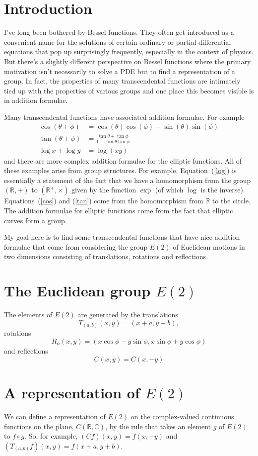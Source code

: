 \documentclass{article}
\begin{document}
\section{Introduction}
I've long been bothered by Bessel functions.
They often get introduced as a convenient name for the solutions of certain ordinary or partial differential equations that pop up surprisingly frequently, especially in the context of physics.
But there's a slightly different perspective on Bessel functions where the primary motivation isn't necessarily to solve a PDE but to find a representation of a group.
In fact, the properties of many transcendental functions are intimately tied up with the properties of various groups and one place this becomes visible is in addition formulae.

Many transcendental functions have associated addition formulae.
For example
\begin{align}
\cos(\theta+\phi) & = \cos(\theta)\cos(\phi)-\sin(\theta)\sin(\phi) \label{cos} \\
\tan(\theta+\phi) &= \frac{\tan\theta+\tan\phi}{1-\tan\theta\tan\phi} \label{tan} \\
\log x+\log y &= \log(xy) \label{log}
\end{align}
and there are more complex addition formulae for the elliptic functions.
All of these examples arise from group structures.
For example, Equation~(\ref{log}) is essentially a statement of the fact that we have a homomorphism from the group $(\mathbb{R},+)$ to $(\mathbb{R}^+,\times)$ given by the function $\exp$ (of which $\log$ is the inverse).
Equations~(\ref{cos}) and (\ref{tan}) come from the homomorphism from $\mathbb{R}$ to the circle.
The addition formulae for elliptic functions come from the fact that elliptic curves form a group.

My goal here is to find some transcendental functions that have nice addition formulae that come from considering the group $E(2)$ of Euclidean motions in two dimensions consisting of translations, rotations and reflections.

\section{The Euclidean group $E(2)$}
The elements of $E(2)$ are generated by the translations
\[
T_{(a,b)}(x,y) = (x+a,y+b),
\]
rotations
\[
R_{\phi}(x,y) = (x\cos\phi-y\sin\phi,x\sin\phi+y\cos\phi)
\]
and reflections
\[
C(x,y) = C(x,-y)
\]

\section{A representation of $E(2)$}
We can define a representation of $E(2)$ on the complex-valued continuous functions on the plane, $C(\mathbb{R},\mathbb{C})$,
by the rule that takes an element $g$ of $E(2)$ to $f \circ g$.
So, for example, $(Cf)(x,y) = f(x,-y)$ and $(T_{(a,b)}f)(x,y) = f(x+a,y+b)$.
\end{document}
